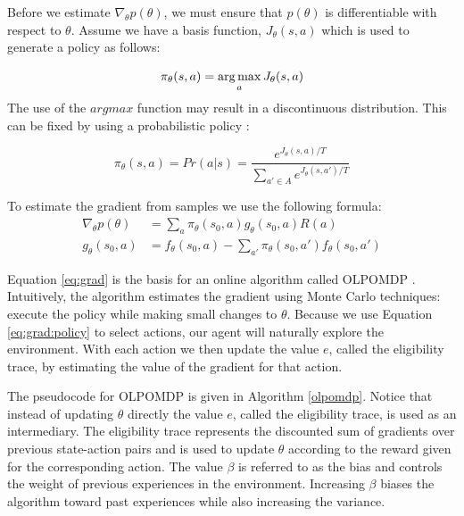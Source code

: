 Before we estimate $\nabla_\theta p(\theta)$, we must ensure that $p(\theta)$ is differentiable with respect to $\theta$. Assume we have a basis function, $J_\theta(s,a)$ which is used to generate a policy as follows:

\[
    \pi_\theta(s,a) = \operatorname*{arg\,max}_a J_\theta(s,a)
\]
The use of the $argmax$ function may result in a discontinuous distribution. This can be fixed by using a probabilistic policy \cite{olpomdp:lecture}:

\begin{equation}
\label{eq:grad:policy}
    \pi_\theta(s,a) = Pr(a|s) = \frac{e^{J_\theta(s,a)/T}}{\sum\limits_{a'\in A} e^{J_\theta(s,a')/T}}
\end{equation}

To estimate the gradient from samples we use the following formula:
\begin{equation}
\label{eq:grad}
    \begin{aligned}
        \nabla_\theta p(\theta) &= \sum_a\pi_\theta(s_0,a)g_\theta(s_0,a)R(a) \\
        g_\theta(s_0,a) &= f_\theta(s_0, a) - \sum\limits_{a'} \pi_\theta(s_0,a')f_\theta(s_0,a')
    \end{aligned}
\end{equation}

Equation \ref{eq:grad} is the basis for an online algorithm called OLPOMDP \cite{olpomdp}. Intuitively, the algorithm estimates the gradient using Monte Carlo techniques: execute the policy while making small changes to $\theta$. Because we use Equation \ref{eq:grad:policy} to select actions, our agent will naturally explore the environment. With each action we then update the value $e$, called the eligibility trace, by estimating the value of the gradient for that action.

The pseudocode for OLPOMDP is given in Algorithm \ref{olpomdp}. Notice that instead of updating $\theta$ directly the value $e$, called the eligibility trace, is used as an intermediary. The eligibility trace represents the discounted sum of gradients over previous state-action pairs and is used to update $\theta$ according to the reward given for the corresponding action. The value $\beta$ is referred to as the bias and controls the weight of previous experiences in the environment. Increasing $\beta$ biases the algorithm toward past experiences while also increasing the variance. 

